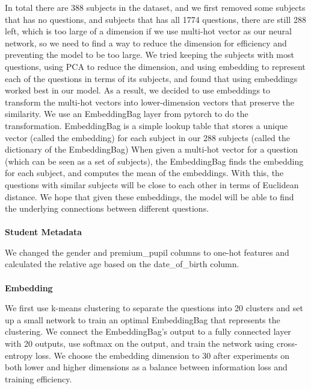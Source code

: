 \documentclass{article}
\begin{document}
In total there are 388 subjects in the dataset, and we first removed some subjects that has no questions, and subjects that has all 1774 questions, there are still 288 left, which is too large of a dimension if we use multi-hot vector as our neural network, so we need to find a way to reduce the dimension for efficiency and preventing the model to be too large. We tried keeping the subjects with most questions, using PCA to reduce the dimension, and using embedding to represent each of the questions in terms of its subjects, and found that using embeddings worked best in our model. As a result, we decided to use embeddings to transform the multi-hot vectors into lower-dimension vectors that preserve the similarity.
We use an EmbeddingBag layer from pytorch to do the transformation. EmbeddingBag is a simple lookup table that stores a unique vector (called the embedding) for each subject in our 288 subjects (called the dictionary of the EmbeddingBag) When given a multi-hot vector for a question (which can be seen as a set of subjects), the EmbeddingBag finds the embedding for each subject, and computes the mean of the embeddings. With this, the questions with similar subjects will be close to each other in terms of Euclidean distance. We hope that given these embeddings, the model will be able to find the underlying connections between different questions.
\\
\\
\textbf{Student Metadata}

We changed the gender and premium\_pupil columns to one-hot features and calculated the relative age based on the date\_of\_birth column.
\\
\\
\textbf{Embedding}

We first use k-means clustering to separate the questions into 20 clusters and set up a small network to train an optimal EmbeddingBag that represents the clustering. We connect the EmbeddingBag’s output to a fully connected layer with 20 outputs, use softmax on the output, and train the network using cross-entropy loss. We choose the embedding dimension to 30 after experiments on both lower and higher dimensions as a balance between information loss and training efficiency.
\end{document}
